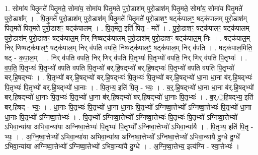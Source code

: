 \documentclass[17pt]{extarticle}
\begin{document}
1. सोमा॑य पितृ॒मते॑ पितृ॒मते॒ सोमा॑य॒ सोमा॑य पितृ॒मते॑ पुरो॒डाश॑म् पुरो॒डाश॑म् पितृ॒मते॒ सोमा॑य॒ सोमा॑य पितृ॒मते॑ पुरो॒डाश᳚म् । . पि॒तृ॒मते॑ पुरो॒डाश॑म् पुरो॒डाश॑म् पितृ॒मते॑ पितृ॒मते॑ पुरो॒डाशꣳ॒॒ षट्क॑पालꣳ॒॒ षट्क॑पालम् पुरो॒डाश॑म् पितृ॒मते॑ पितृ॒मते॑ पुरो॒डाशꣳ॒॒ षट्क॑पालम् । . पि॒तृ॒मत॒ इति॑ पितृ - मते᳚ । . पु॒रो॒डाशꣳ॒॒ षट्क॑पालꣳ॒॒ षट्क॑पालम् पुरो॒डाश॑म् पुरो॒डाशꣳ॒॒ षट्क॑पाल॒म् निर् णिष्षट्क॑पालम् पुरो॒डाश॑म् पुरो॒डाशꣳ॒॒ षट्क॑पाल॒म् निः । . षट्क॑पाल॒म् निर् णिष्षट्क॑पालꣳ॒॒ षट्क॑पाल॒म् निर् व॑पति वपति॒ निष्षट्क॑पालꣳ॒॒ षट्क॑पाल॒म् निर् व॑पति । . षट्क॑पाल॒मिति॒ षट् - क॒पा॒ल॒म् । . निर् व॑पति वपति॒ निर् णिर् व॑पति पि॒तृभ्यः॑ पि॒तृभ्यो॑ वपति॒ निर् णिर् व॑पति पि॒तृभ्यः॑ । . व॒प॒ति॒ पि॒तृभ्यः॑ पि॒तृभ्यो॑ वपति वपति पि॒तृभ्यो॑ बर्.हि॒षद्भ्यो॑ बर्.हि॒षद्भ्यः॑ पि॒तृभ्यो॑ वपति वपति पि॒तृभ्यो॑ बर्.हि॒षद्भ्यः॑ । . पि॒तृभ्यो॑ बर्.हि॒षद्भ्यो॑ बर्.हि॒षद्भ्यः॑ पि॒तृभ्यः॑ पि॒तृभ्यो॑ बर्.हि॒षद्भ्यो॑ धा॒ना धा॒ना ब॑र्.हि॒षद्भ्यः॑ पि॒तृभ्यः॑ पि॒तृभ्यो॑ बर्.हि॒षद्भ्यो॑ धा॒नाः । . पि॒तृभ्य॒ इति॑ पि॒तृ - भ्यः॒ । . ब॒र्॒.हि॒षद्भ्यो॑ धा॒ना धा॒ना ब॑र्.हि॒षद्भ्यो॑ बर्.हि॒षद्भ्यो॑ धा॒नाः पि॒तृभ्यः॑ पि॒तृभ्यो॑ धा॒ना ब॑र्.हि॒षद्भ्यो॑ बर्.हि॒षद्भ्यो॑ धा॒नाः पि॒तृभ्यः॑ । . ब॒र्.॒हि॒षद्भ्य॒ इति॑ बर्.हि॒षद् - भ्यः॒ । . धा॒नाः पि॒तृभ्यः॑ पि॒तृभ्यो॑ धा॒ना धा॒नाः पि॒तृभ्यो᳚ ऽग्निष्वा॒त्तेभ्यो᳚ ऽग्निष्वा॒त्तेभ्यः॑ पि॒तृभ्यो॑ धा॒ना धा॒नाः पि॒तृभ्यो᳚ ऽग्निष्वा॒त्तेभ्यः॑ । . पि॒तृभ्यो᳚ ऽग्निष्वा॒त्तेभ्यो᳚ ऽग्निष्वा॒त्तेभ्यः॑ पि॒तृभ्यः॑ पि॒तृभ्यो᳚ ऽग्निष्वा॒त्तेभ्यो॑ ऽभिवा॒न्या॑या अभिवा॒न्या॑या अग्निष्वा॒त्तेभ्यः॑ पि॒तृभ्यः॑ पि॒तृभ्यो᳚ ऽग्निष्वा॒त्तेभ्यो॑ ऽभिवा॒न्या॑यै । . पि॒तृभ्य॒ इति॑ पि॒तृ - भ्यः॒ । . अ॒ग्नि॒ष्वा॒त्तेभ्यो॑ ऽभिवा॒न्या॑या अभिवा॒न्या॑या अग्निष्वा॒त्तेभ्यो᳚ ऽग्निष्वा॒त्तेभ्यो॑ ऽभिवा॒न्या॑यै दु॒ग्धे दु॒ग्धे॑ ऽभिवा॒न्या॑या अग्निष्वा॒त्तेभ्यो᳚ ऽग्निष्वा॒त्तेभ्यो॑ ऽभिवा॒न्या॑यै दु॒ग्धे । . अ॒ग्नि॒ष्वा॒त्तेभ्य॒ इत्य॑ग्नि - स्वा॒त्तेभ्यः॑ । \newline
\end{document}
